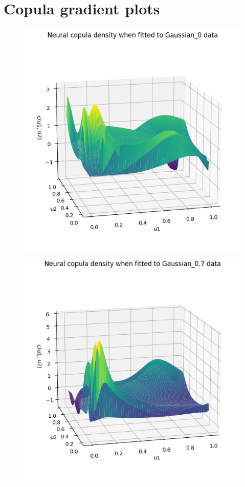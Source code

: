\documentclass[%
a4paper,							
11pt,								
bibliography=totoc,						
abstracton=true					
]
{scrartcl}
\theoremstyle{plain}
\theoremstyle{definition}
\theoremstyle{remark}
\newcommand{\1}{\mathbbm{1}}
\begin{document}
\section{Copula gradient plots}\label{sec:CopulaGradientsPlots}
\begin{figure}[H]
    \centering
    \begin{minipage}{0.45\textwidth}
        \centering
        \includegraphics[width=\textwidth]{5ResultsDiscussion/pictures/PortfolioTest/CopulaGradient1.png}
    \end{minipage}
    \hfill
    \begin{minipage}{0.45\textwidth}
        \centering
        \includegraphics[width=\textwidth]{5ResultsDiscussion/pictures/PortfolioTest/CopulaGradient2.png}

\end{minipage}
\end{figure}
\end{document}
